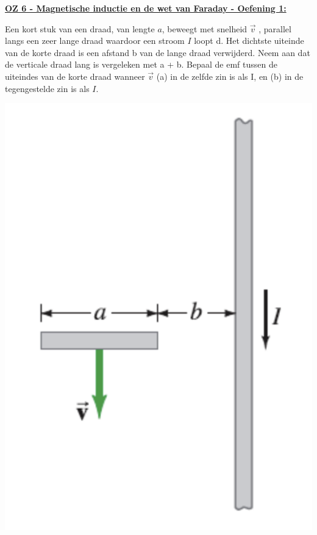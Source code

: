 \textbf{\underline{OZ 6 - Magnetische inductie en de wet van Faraday - Oefening 1:}}
\vspace{0.5cm}

    \begin{minipage}{.8\textwidth}
        Een kort stuk van een draad, van lengte $a$, beweegt met snelheid $\vec{v}$ , parallel langs
        een zeer lange draad waardoor een stroom $I$ loopt d. Het dichtste uiteinde
        van de korte draad is een afstand b van de lange draad verwijderd. Neem aan dat de
        verticale draad lang is vergeleken met a + b. Bepaal de emf tussen de uiteindes van
        de korte draad wanneer $\vec{v}$ (a) in de zelfde zin is als I, en (b) in de tegengestelde zin
        is als $I$.
    \end{minipage}
    \begin{minipage}{.16\textwidth}
        \includegraphics[scale = 0.22]{oz06/resources/Oz6Oef1.png}
    \end{minipage}

    \begin{description}[labelwidth=1.5cm, leftmargin=!]
        \item[Geg. :]
        \item[Gevr. :] 
        \item[Opl. :]
    \end{description}


\vspace{1cm}